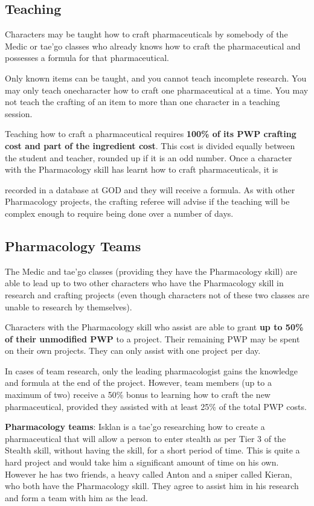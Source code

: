     \subsection{Teaching}

Characters may be taught how to craft pharmaceuticals by somebody of the Medic or tae'go classes who already knows how to craft the pharmaceutical and possesses a formula for that pharmaceutical.

Only known items can be taught, and you cannot teach incomplete research. You may only teach onecharacter how to craft one pharmaceutical at a time. You may not teach the crafting of an item to more than one character in a teaching session.

Teaching how to craft a pharmaceutical requires \textbf{100\% of its PWP crafting cost and part of the ingredient cost}. This cost is divided equally between the student and teacher, rounded up if it is an odd number. Once a character with the Pharmacology skill has learnt how to craft pharmaceuticals, it is

recorded in a database at GOD and they will receive a formula. As with other Pharmacology projects, the crafting referee will advise if the teaching will be complex enough to require being done over a number of days.

\subsection{Pharmacology Teams}

The Medic and tae'go classes (providing they have the Pharmacology skill) are able to lead up to two other characters who have the Pharmacology skill in research and crafting projects (even though characters not of these two classes are unable to research by themselves).

Characters with the Pharmacology skill who assist are able to grant \textbf{up to 50\% of their unmodified PWP} to a project. Their remaining PWP may be spent on their own projects. They can only assist with one project per day.

In cases of team research, only the leading pharmacologist gains the knowledge and formula at the end of the project. However, team members (up to a maximum of two) receive a 50\% bonus to learning how to craft the new pharmaceutical, provided they assisted with at least 25\% of the total PWP costs.

\textbf{Pharmacology teams}: Isklan is a tae'go researching how to create a pharmaceutical that will allow a person to enter stealth as per Tier 3 of the Stealth skill, without having the skill, for a short period of time. This is quite a hard project and would take him a significant amount of time on his own. However he has two friends, a heavy called Anton and a sniper called Kieran, who both have the Pharmacology skill. They agree to assist him in his research and form a team with him as the lead.

